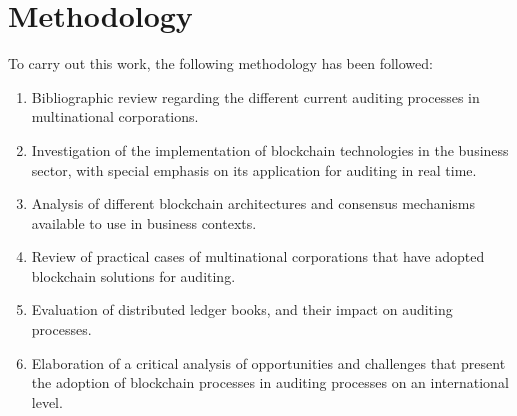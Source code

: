 \chapter{Methodology}

To carry out this work, the following methodology has been followed:

\begin{enumerate}
    \item Bibliographic review regarding the different current auditing processes in multinational corporations.
    \item Investigation of the implementation of blockchain technologies in the business sector, with special emphasis on its application for auditing in real time.
    \item Analysis of different blockchain architectures and consensus mechanisms available to use in business contexts.
    \item Review of practical cases of multinational corporations that have adopted blockchain solutions for auditing.
    \item Evaluation of distributed ledger books, and their impact on auditing processes.
    \item Elaboration of a critical analysis of opportunities and challenges that present the adoption of blockchain processes in auditing processes on an international level.
\end{enumerate}